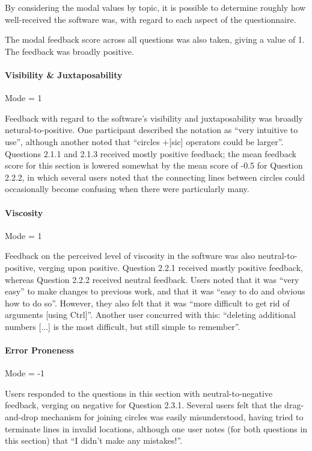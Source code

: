 \documentclass[12pt,twoside,notitlepage,xetex]{report}
\begin{document}
{By considering the modal values by topic, it is possible to determine roughly how well-received the software was, with regard to each aspect of the questionnaire.

The modal feedback score across all questions was also taken, giving a value of 1.  The feedback was broadly positive.

\paragraph{Visibility \& Juxtaposability}\hfill

Mode = 1

Feedback with regard to the software's visibility and juxtaposability was broadly netural-to-positive.  One participant described the notation as ``very intuitive to use'', although another noted that ``circles +[sic] operators could be larger''.  Questions 2.1.1 and 2.1.3 received mostly positive feedback; the mean feedback score for this section is lowered somewhat by the mean score of -0.5 for Question 2.2.2, in which several users noted that the connecting lines between circles could occasionally become confusing when there were particularly many.

\paragraph{Viscosity}\hfill

Mode = 1

Feedback on the perceived level of viscosity in the software was also neutral-to-positive, verging upon positive. Question 2.2.1 received mostly positive feedback, whereas Question 2.2.2 received neutral feedback.  Users noted that it was ``very easy'' to make changes to previous work, and that it was ``easy to do and obvious how to do so''.  However, they also felt that it was ``more difficult to get rid of arguments [using Ctrl]''.  Another user concurred with this: ``deleting additional numbers [...] is the most difficult, but still simple to remember''.

\paragraph{Error Proneness}\hfill

Mode = -1

Users responded to the questions in this section with neutral-to-negative feedback, verging on negative for Question 2.3.1.  Several users felt that the drag-and-drop mechanism for joining circles was easily misunderstood, having tried to terminate lines in invalid locations, although one user notes (for both questions in this section) that ``I didn't make any mistakes!''.

}
\end{document}
